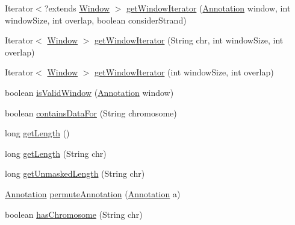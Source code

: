 \begin{DoxyCompactItemize}
\item 
Iterator$<$?extends \hyperlink{interfaceumms_1_1core_1_1feature_1_1_window}{Window} $>$ \hyperlink{classumms_1_1core_1_1coordinatesystem_1_1_transcript_in_genomic_space_a8d2e25ee2f28cf4570798be66474b8d8}{get\+Window\+Iterator} (\hyperlink{interfaceumms_1_1core_1_1annotation_1_1_annotation}{Annotation} window, int window\+Size, int overlap, boolean consider\+Strand)
\item 
Iterator$<$ \hyperlink{interfaceumms_1_1core_1_1feature_1_1_window}{Window} $>$ \hyperlink{classumms_1_1core_1_1coordinatesystem_1_1_transcript_in_genomic_space_a47e813dd7bb87e85948652b451ac3300}{get\+Window\+Iterator} (String chr, int window\+Size, int overlap)
\item 
Iterator$<$ \hyperlink{interfaceumms_1_1core_1_1feature_1_1_window}{Window} $>$ \hyperlink{classumms_1_1core_1_1coordinatesystem_1_1_transcript_in_genomic_space_a818dd98c801d1cec68ebc204d883ef84}{get\+Window\+Iterator} (int window\+Size, int overlap)
\item 
boolean \hyperlink{classumms_1_1core_1_1coordinatesystem_1_1_transcript_in_genomic_space_a2b0985bdebf24dc9c6840cbff3533682}{is\+Valid\+Window} (\hyperlink{interfaceumms_1_1core_1_1annotation_1_1_annotation}{Annotation} window)
\item 
boolean \hyperlink{classumms_1_1core_1_1coordinatesystem_1_1_transcript_in_genomic_space_ae3b26ae31c790de615ccb58067828583}{contains\+Data\+For} (String chromosome)
\item 
long \hyperlink{classumms_1_1core_1_1coordinatesystem_1_1_transcript_in_genomic_space_af5d0d7a6d07a15ffc4384c98379d58a0}{get\+Length} ()
\item 
long \hyperlink{classumms_1_1core_1_1coordinatesystem_1_1_transcript_in_genomic_space_af6795af68b667c678d24857e639137dc}{get\+Length} (String chr)
\item 
long \hyperlink{classumms_1_1core_1_1coordinatesystem_1_1_transcript_in_genomic_space_a9c7d62e75789b55cd3aef2087b832565}{get\+Unmasked\+Length} (String chr)
\item 
\hyperlink{interfaceumms_1_1core_1_1annotation_1_1_annotation}{Annotation} \hyperlink{classumms_1_1core_1_1coordinatesystem_1_1_transcript_in_genomic_space_a26430afb3110a71a4110fa8cbcfbe098}{permute\+Annotation} (\hyperlink{interfaceumms_1_1core_1_1annotation_1_1_annotation}{Annotation} a)
\item 
boolean \hyperlink{classumms_1_1core_1_1coordinatesystem_1_1_transcript_in_genomic_space_a1c6eb7e97ffa4bd2292560f401a5fde0}{has\+Chromosome} (String chr)

\end{DoxyCompactItemize}
